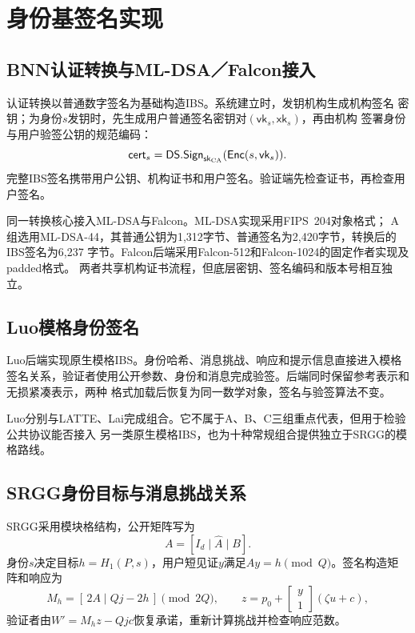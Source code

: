 \section{身份基签名实现}

\subsection{BNN认证转换与ML-DSA／Falcon接入}

认证转换以普通数字签名为基础构造IBS\cite{galindo2006ibs}。系统建立时，发钥机构生成机构签名
密钥；为身份$s$发钥时，先生成用户普通签名密钥对$(\mathsf{vk}_s,\mathsf{xk}_s)$，再由机构
签署身份与用户验签公钥的规范编码：
\[
 \mathsf{cert}_s=\mathsf{DS.Sign}_{\mathsf{sk}_{\rm CA}}
       (\mathsf{Enc}(s,\mathsf{vk}_s)).
\]
完整IBS签名携带用户公钥、机构证书和用户签名。验证端先检查证书，再检查用户签名。

同一转换核心接入ML-DSA与Falcon。ML-DSA实现采用FIPS~204对象格式\cite{nist2024fips204}；
A组选用ML-DSA-44，其普通公钥为1,312字节、普通签名为2,420字节，转换后的IBS签名为6,237
字节。Falcon后端采用Falcon-512和Falcon-1024的固定作者实现及padded格式\cite{falcon2020}。
两者共享机构证书流程，但底层密钥、签名编码和版本号相互独立。

\subsection{Luo模格身份签名}

Luo后端实现原生模格IBS\cite{luo2024ibs}。身份哈希、消息挑战、响应和提示信息直接进入模格
签名关系，验证者使用公开参数、身份和消息完成验签。后端同时保留参考表示和无损紧凑表示，两种
格式加载后恢复为同一数学对象，签名与验签算法不变。

Luo分别与LATTE、Lai完成组合。它不属于A、B、C三组重点代表，但用于检验公共协议能否接入
另一类原生模格IBS，也为十种常规组合提供独立于SRGG的模格路线。

\subsection{SRGG身份目标与消息挑战关系}

SRGG采用模块格结构，公开矩阵写为
\[
 A=[I_d\mid\widehat A\mid B].
\]
身份$s$决定目标$h=H_1(P,s)$，用户短见证$y$满足$Ay=h\pmod Q$。签名构造矩阵和响应为
\[
 M_h=[\,2A\mid Qj-2h\,]\pmod{2Q},
 \qquad
 z=p_0+\begin{bmatrix}y\\1\end{bmatrix}(\zeta u+c),
\]
验证者由$W'=M_hz-Qjc$恢复承诺，重新计算挑战并检查响应范数\cite{jia2025ibs}。

